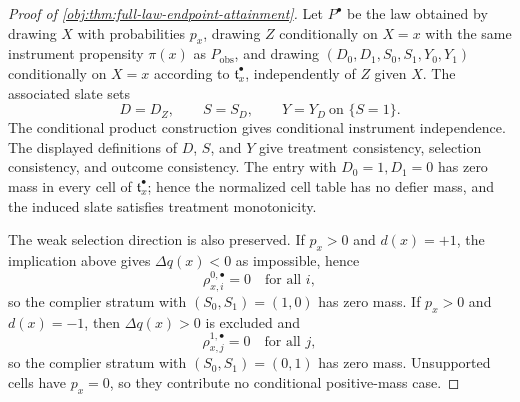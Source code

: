 \begin{proof}[Proof of \cref{obj:thm:full-law-endpoint-attainment}]
Let \(P^\bullet\) be the law obtained by drawing \(X\) with probabilities \(p_x\), drawing \(Z\) conditionally on \(X=x\) with the same instrument propensity \(\pi(x)\) as \(P_{\mathrm{obs}}\), and drawing \((D_0,D_1,S_0,S_1,Y_0,Y_1)\) conditionally on \(X=x\) according to \(\mathfrak t^\bullet_x\), independently of \(Z\) given \(X\).  The associated slate sets
\[
D=D_Z,\qquad S=S_D,\qquad Y=Y_D\ \text{on }\{S=1\}.
\]
The conditional product construction gives conditional instrument independence. %
The displayed definitions of \(D\), \(S\), and \(Y\) give treatment consistency, selection consistency, and outcome consistency. %
The entry with \(D_0=1,D_1=0\) has zero mass in every cell of \(\mathfrak t^\bullet_x\); hence the normalized cell table has no defier mass, and the induced slate satisfies treatment monotonicity. %

The weak selection direction is also preserved.  If \(p_x>0\) and \(d(x)=+1\), the implication above gives \(\Delta q(x)<0\) as impossible, hence
\[
\rho^{0,\bullet}_{x,i}=0\quad\text{for all }i,
\]
so the complier stratum with \((S_0,S_1)=(1,0)\) has zero mass.  If \(p_x>0\) and \(d(x)=-1\), then \(\Delta q(x)>0\) is excluded and
\[
\rho^{1,\bullet}_{x,j}=0\quad\text{for all }j,
\]
so the complier stratum with \((S_0,S_1)=(0,1)\) has zero mass.  Unsupported cells have \(p_x=0\), so they contribute no conditional positive-mass case. %


\end{proof}
